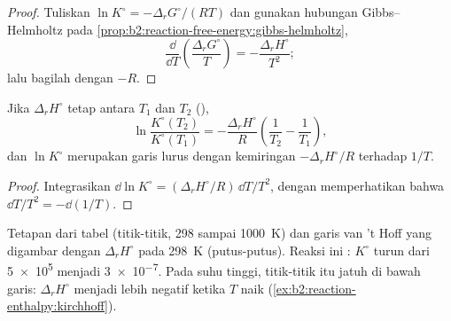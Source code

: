 \begin{proof}
Tuliskan $\ln K^\circ = -\Delta_r G^\circ/(RT)$ dan gunakan hubungan
Gibbs--Helmholtz pada \cref{prop:b2:reaction-free-energy:gibbs-helmholtz},
\[
  \frac{\dd}{\dd T}\left(\frac{\Delta_r G^\circ}{T}\right) =
  -\frac{\Delta_r H^\circ}{T^2} ;
\]
lalu bagilah dengan $-R$.
\end{proof}

\begin{proposition}\label{prop:b2:equilibrium-shifts:integrated}
Jika $\Delta_r H^\circ$ tetap antara $T_1$ dan $T_2$ (),
\[
  \ln\frac{K^\circ(T_2)}{K^\circ(T_1)} = -\frac{\Delta_r H^\circ}{R}\left(
  \frac{1}{T_2} - \frac{1}{T_1}\right),
\]
dan $\ln K^\circ$ merupakan garis lurus dengan kemiringan
$-\Delta_r H^\circ/R$ terhadap $1/T$.
\end{proposition}

\begin{proof}
Integrasikan $\dd\ln K^\circ = (\Delta_r H^\circ/R)\,\dd T/T^2$, dengan
memperhatikan bahwa $\dd T/T^2 = -\dd(1/T)$.
\end{proof}

\begin{omfigure}

{\small Tetapan  dari tabel (titik-titik, 298
sampai \qty{1000}{K}) dan garis van 't Hoff yang digambar dengan
$\Delta_r H^\circ$ pada \qty{298}{K} (putus-putus). Reaksi ini :
$K^\circ$ turun dari \num{5e5} menjadi \num{3e-7}. Pada suhu tinggi,
titik-titik itu jatuh di bawah garis: $\Delta_r H^\circ$ menjadi lebih
negatif ketika $T$ naik (\cref{ex:b2:reaction-enthalpy:kirchhoff}).}
\end{omfigure}

